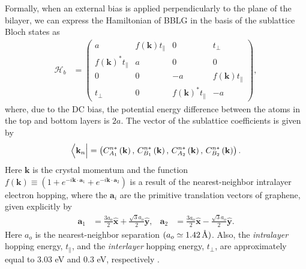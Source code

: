 \documentclass[twocolumn,secnumarabic,amssymb, nobibnotes, aps, prd, superscriptaddress]{revtex4-1}
\newcommand{\angstrom}{\mbox{\normalfont\AA}}
\begin{document}
Formally, when an external bias is applied perpendicularly to the plane of the bilayer, we can express the Hamiltonian of BBLG in the basis of the sublattice Bloch states as
\begin{equation}
\begin{aligned}\mathcal{H}_{b} & =\left(\begin{array}{cccc}
a & f\left(\mathbf{k}\right)t_{\parallel} & 0 & t_{\perp}\\
f\left(\mathbf{k}\right)^{*}t_{\parallel} & a & 0 & 0\\
0 & 0 & -a & f\left(\mathbf{k}\right)t_{\parallel}\\
t_{\perp} & 0 & f\left(\mathbf{k}\right)^{*}t_{\parallel} & -a
\end{array}\right),\end{aligned}\label{eq:ham}
\end{equation}
where, due to the DC bias, the potential energy difference between the atoms in the top and bottom layers is $2a$. The vector of the sublattice coefficients is given by $$\Bigl\langle\mathbf{k}_{n}\Bigr|=\left(C_{A_{1}}^{n*}\left(\mathbf{k}\right),\, C_{B_{1}}^{n*}\left(\mathbf{k}\right),\, C_{A_{2}}^{n*}\left(\mathbf{k}\right),\, C_{B_{2}}^{n*}\left(\mathbf{k}\right)\right).$$ Here $\mathbf{k}$ is the crystal momentum and the function $f\left(\mathbf{k}\right)\equiv(1+e^{-i\mathbf{k}\cdot\mathbf{a}_{1}}+e^{-i\mathbf{k}\cdot\mathbf{a}_{2}})$ is a result of the nearest-neighbor intralayer electron hopping, where the $\mathbf{a}_i$ are the primitive translation vectors of graphene, given explicitly by 
\begin{equation}\begin{aligned}\mathbf{a}_{1} & =\frac{3a_{o}}{2}\widehat{\mathbf{x}}+\frac{\sqrt{3}a_{o}}{2}\widehat{\mathbf{y}},\end{aligned}
\begin{aligned}\mathbf{a}_{2} & =\frac{3a_{o}}{2}\widehat{\mathbf{x}}-\frac{\sqrt{3}a_{o}}{2}\widehat{\mathbf{y}}.\end{aligned}
\end{equation} 
Here $a_{o}$ is the nearest-neighbor separation $(a_{o}\simeq1.42\, \angstrom)$. Also, the \textit{intralayer} hopping energy, $t_{\parallel}$, and the \textit{interlayer} hopping energy, $t_{\perp}$, are approximately equal to 3.03 eV and 0.3 eV, respectively \cite{malard2007probing, zhang2008}. 
\end{document}
